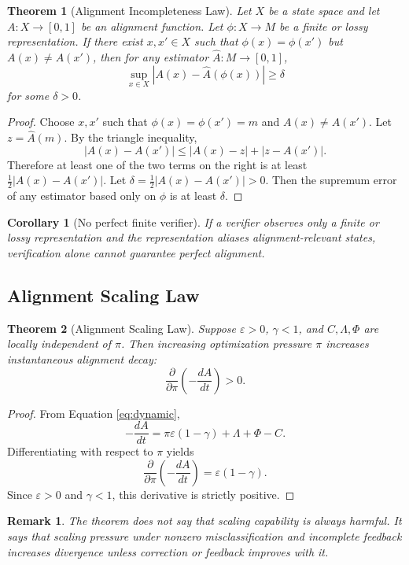 \documentclass[11pt]{article}
\newtheorem{theorem}{Theorem}[section]
\newtheorem{corollary}{Corollary}[section]
\newtheorem{remark}{Remark}[section]
\newcommand{\eps}{\varepsilon}
\begin{document}
\begin{theorem}[Alignment Incompleteness Law]
Let \(X\) be a state space and let \(A:X\to[0,1]\) be an alignment function. Let \(\phi:X\to M\) be a finite or lossy representation. If there exist \(x,x'\in X\) such that \(\phi(x)=\phi(x')\) but \(A(x)\neq A(x')\), then for any estimator \(\hat A:M\to[0,1]\),
\[
\sup_{x\in X}|A(x)-\hat A(\phi(x))|\ge \delta
\]
for some \(\delta>0\).
\end{theorem}

\begin{proof}
Choose \(x,x'\) such that \(\phi(x)=\phi(x')=m\) and \(A(x)\neq A(x')\). Let \(z=\hat A(m)\). By the triangle inequality,
\[
|A(x)-A(x')|\le |A(x)-z|+|z-A(x')|.
\]
Therefore at least one of the two terms on the right is at least \(\frac12|A(x)-A(x')|\). Let \(\delta=\frac12|A(x)-A(x')|>0\). Then the supremum error of any estimator based only on \(\phi\) is at least \(\delta\).
\end{proof}

\begin{corollary}[No perfect finite verifier]
If a verifier observes only a finite or lossy representation and the representation aliases alignment-relevant states, verification alone cannot guarantee perfect alignment.
\end{corollary}

\subsection{Alignment Scaling Law}

\begin{theorem}[Alignment Scaling Law]
Suppose \(\eps>0\), \(\gamma<1\), and \(C,\Lambda,\Phi\) are locally independent of \(\pi\). Then increasing optimization pressure \(\pi\) increases instantaneous alignment decay:
\[
\frac{\partial}{\partial \pi}\left(-\frac{dA}{dt}\right)>0.
\]
\end{theorem}

\begin{proof}
From Equation \eqref{eq:dynamic},
\[
-\frac{dA}{dt}=\pi\eps(1-\gamma)+\Lambda+\Phi-C.
\]
Differentiating with respect to \(\pi\) yields
\[
\frac{\partial}{\partial \pi}\left(-\frac{dA}{dt}\right)=\eps(1-\gamma).
\]
Since \(\eps>0\) and \(\gamma<1\), this derivative is strictly positive.
\end{proof}

\begin{remark}
The theorem does not say that scaling capability is always harmful. It says that scaling pressure under nonzero misclassification and incomplete feedback increases divergence unless correction or feedback improves with it.
\end{remark}
\end{document}

